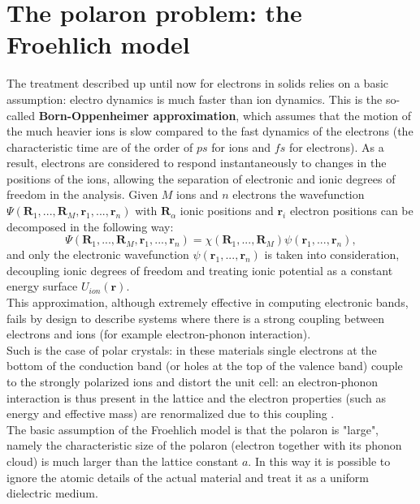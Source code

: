 \documentclass[12pt, a4paper]{report}
\numberwithin{equation}{section}
\begin{document}
\section{The polaron problem: the Froehlich model}
The treatment described up until now for electrons in solids relies on a basic assumption: electro dynamics is much faster than ion 
dynamics. This is the so-called \textbf{Born-Oppenheimer approximation}, which assumes that the motion of the much heavier ions is 
slow compared to the fast dynamics of the electrons (the characteristic time are of the order of $ps$ for ions and $fs$ for 
electrons). As a result, electrons are considered to respond instantaneously to changes in the positions of the ions, allowing 
the separation of electronic and ionic degrees of freedom in the analysis. Given $M$ ions and $n$ electrons the wavefunction 
$\Psi(\mathbf{R}_1,...,\mathbf{R}_M,\mathbf{r}_1,...,\mathbf{r}_n)$ with $\mathbf{R}_\alpha$ ionic positions and $\mathbf{r}_i$ electron positions can be decomposed in the following way:
\begin{equation}
    \Psi(\mathbf{R}_1,...,\mathbf{R}_M,\mathbf{r}_1,...,\mathbf{r}_n)=\chi(\mathbf{R}_1,...,\mathbf{R}_M)\psi(\mathbf{r}_1,...,\mathbf{r}_n),
\end{equation}
and only the electronic wavefunction $\psi(\mathbf{r}_1,...,\mathbf{r}_n)$ is taken into consideration, decoupling ionic degrees of freedom and treating 
ionic potential as a constant energy surface $U_{ion}(\mathbf{r})$.\\
This approximation, although extremely effective in computing electronic bands, fails by design to describe systems where there is a 
strong coupling between electrons and ions (for example electron-phonon interaction).\\
Such is the case of polar crystals: in these materials single electrons at the bottom of the conduction band (or holes at the top of 
the valence band) couple to the strongly polarized ions and distort the unit cell: an electron-phonon interaction is thus present 
in the lattice and the electron properties (such as energy and effective mass) are renormalized due to this coupling \cite{frohlich1954electrons}.\\
The basic assumption of the Froehlich model is that the polaron is "large", namely the characteristic size of the polaron (electron together 
with its phonon cloud) is much larger than the lattice constant $a$. In this way it is possible to ignore the atomic details of the actual 
material and treat it as a uniform dielectric medium.\\
\end{document}
